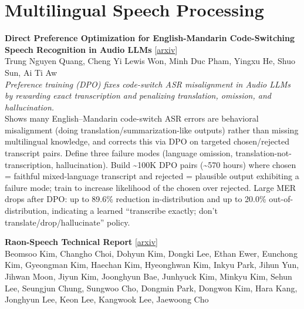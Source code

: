 \documentclass[12pt,letterpaper]{article}
\begin{document}
\medskip


\section*{Multilingual Speech Processing}

{\small\textbf{Direct Preference Optimization for English-Mandarin Code-Switching Speech Recognition in Audio LLMs}} {\scriptsize[\href{https://arxiv.org/abs/2605.23975}{arxiv}]}\\
{\scriptsize Trung Nguyen Quang, Cheng Yi Lewis Won, Minh Duc Pham, Yingxu He, Shuo Sun, Ai Ti Aw}\\

{\small\textit{Preference training (DPO) fixes code-switch ASR misalignment in Audio LLMs by rewarding exact transcription and penalizing translation, omission, and hallucination.}}\\[1pt]
{\footnotesize Shows many English--Mandarin code-switch ASR errors are behavioral misalignment (doing translation/summarization-like outputs) rather than missing multilingual knowledge, and corrects this via DPO on targeted chosen/rejected transcript pairs. Define three failure modes (language omission, translation-not-transcription, hallucination). Build \textasciitilde{}100K DPO pairs (\textasciitilde{}570 hours) where chosen = faithful mixed-language transcript and rejected = plausible output exhibiting a failure mode; train to increase likelihood of the chosen over rejected. Large MER drops after DPO: up to 89.6\% reduction in-distribution and up to 20.0\% out-of-distribution, indicating a learned ``transcribe exactly; don't translate/drop/hallucinate'' policy.}

\medskip

{\small\textbf{Raon-Speech Technical Report}} {\scriptsize[\href{https://arxiv.org/abs/2605.23912}{arxiv}]}\\
{\scriptsize Beomsoo Kim, Changho Choi, Dohyun Kim, Dongki Lee, Ethan Ewer, Eunchong Kim, Gyeongman Kim, Haechan Kim, Hyeonghwan Kim, Inkyu Park, Jihun Yun, Jihwan Moon, Jiyun Kim, Joonghyun Bae, Junhyuck Kim, Minkyu Kim, Sehun Lee, Seungjun Chung, Sungwoo Cho, Dongmin Park, Dongwon Kim, Hara Kang, Jonghyun Lee, Keon Lee, Kangwook Lee, Jaewoong Cho}\\
\end{document}
